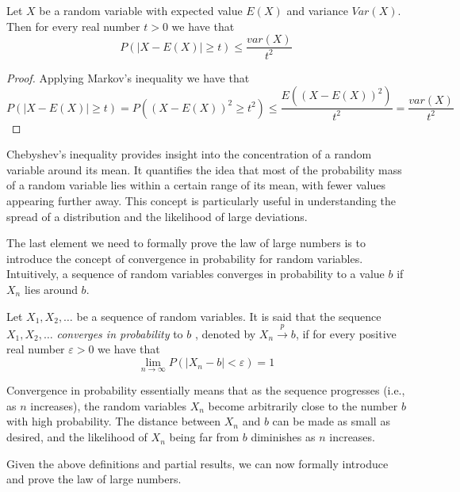 \begin{corollary}
 Let $X$ be a random variable with expected value $E(X)$ and variance $Var(X)$. Then for every real number $t > 0$ we have that
\[
P \left( \left| X - E(X) \right| \geq t \right) \leq \frac{var(X)}{t^2}
\]
\end{corollary}
\begin{proof}
Applying Markov's inequality we have that
\[
P \left( \left| X - E(X) \right| \geq t \right) = P \left( \left( X - E(X) \right)^2 \geq t^2 \right) \leq \frac{E \left( \left( X - E(X) \right)^2 \right)}{t^2} = \frac{var(X)}{t^2}
\]
\end{proof}

Chebyshev's inequality provides insight into the concentration of a random variable around its mean. It quantifies the idea that most of the probability mass of a random variable lies within a certain range of its mean, with fewer values appearing further away. This concept is particularly useful in understanding the spread of a distribution and the likelihood of large deviations.

The last element we need to formally prove the law of large numbers is to introduce the concept of convergence in probability for random variables. Intuitively, a sequence of random variables converges in probability to a value $b$ if $X_n$ lies around $b$.

\begin{definition}
Let $X_{1}, X_{2}, \ldots$ be a sequence  of random variables. It is said that the sequence $X_{1}, X_{2}, \ldots$ \emph{converges in probability} to $b$ , denoted by $X_{n} \overset{p}{\rightarrow}b$, if for every positive real number $\varepsilon>0$ we have that
\[
\lim_{n \rightarrow \infty} P \left( \left| X_{n} - b \right| < \varepsilon \right) = 1
\]
\end{definition}

Convergence in probability essentially means that as the sequence progresses (i.e., as $n$ increases), the random variables $X_n$ become arbitrarily close to the number $b$ with high probability. The distance between $X_n$ and $b$ can be made as small as desired, and the likelihood of $X_n$ being far from $b$ diminishes as $n$ increases.

Given the above definitions and partial results, we can now formally introduce and prove the law of large numbers.

